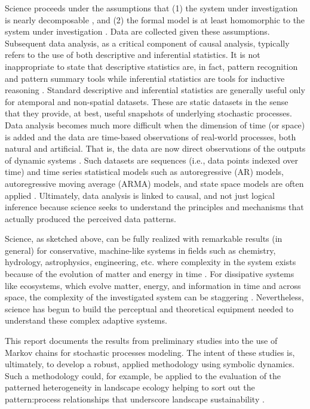 \documentclass[letter,11pt]{article}
\begin{document}
Science proceeds under the assumptions that (1) the system under investigation is nearly decomposable \cite{simon_sciences_1996}, and (2) the formal model is at least homomorphic to the system under investigation \cite{ashby_introduction_1955}. Data are collected given these assumptions. Subsequent data analysis, as a critical component of causal analysis, typically refers to the use of both descriptive and inferential statistics. It is not inappropriate to state that descriptive statistics are, in fact, pattern recognition and pattern summary tools \cite{jain_statistical_2000} while inferential statistics are tools for inductive reasoning \cite{devore_probability_2012}. Standard descriptive and inferential statistics are generally useful only for atemporal and non-spatial datasets. These are static datasets in the sense that they provide, at best, useful snapshots of underlying stochastic processes. Data analysis becomes much more difficult when the dimension of time (or space) is added and the data are time-based observations of real-world processes, both natural and artificial. That is, the data are now direct observations of the outputs of dynamic systems \cite{luenberger_introduction_1979}. Such datasets are sequences (i.e., data points indexed over time) and time series statistical models such as autoregressive (AR) models, autoregressive moving average (ARMA) models, and state space models are often applied \cite{shumway_time_2011}. Ultimately, data analysis is linked to causal, and not just logical inference because science seeks to understand the principles and mechanisms that actually produced the perceived data patterns.

Science, as sketched above, can be fully realized with remarkable results (in general) for conservative, machine-like systems in fields such as chemistry, hydrology, astrophysics, engineering, etc. where complexity in the system exists because of the evolution of matter and energy in time \cite{mainzer_thinking_2007}. For dissipative systems like ecosystems, which evolve matter, energy, and information in time and across space, the complexity of the investigated system can be staggering \cite{mitchell_complexity:_2009}. Nevertheless, science has begun to build the perceptual and theoretical equipment needed to understand these complex adaptive systems.

This report documents the results from preliminary studies into the use of Markov chains for stochastic processes modeling. The intent of these studies is, ultimately, to develop a robust, applied methodology using symbolic dynamics. Such a methodology could, for example, be applied to the evaluation of the patterned heterogeneity in landscape ecology helping to sort out the pattern:process relationships that underscore landscape sustainability \cite{musacchio_scientific_2009}.
\end{document}
